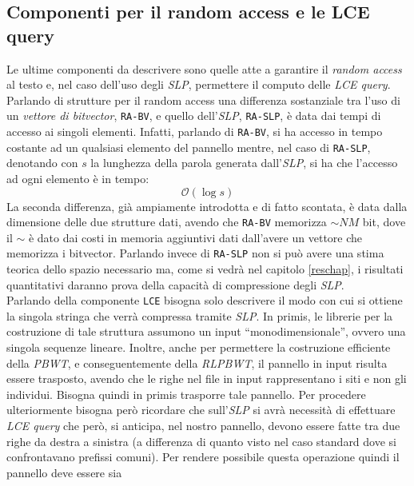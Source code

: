 \subsection{Componenti per il random access e le LCE query}
Le ultime componenti da descrivere sono quelle atte a garantire il
\textit{random access} 
al testo e, nel caso dell'uso degli \textit{SLP}, permettere il computo delle
\textit{LCE query}.\\
Parlando di strutture per il random access una differenza sostanziale tra
l'uso di un \textit{vettore di bitvector}, \texttt{RA-BV}, e quello
dell'\textit{SLP}, \texttt{RA-SLP}, è data dai tempi di accesso ai singoli
elementi. Infatti, parlando di \texttt{RA-BV}, si ha accesso in tempo costante
ad un qualsiasi elemento del pannello mentre, nel caso di \texttt{RA-SLP},
denotando con $s$ la lunghezza della parola generata dall'\textit{SLP}, si ha
che l'accesso ad ogni elemento è in tempo:
\begin{equation}
  \label{eq:timera}
  \mathcal{O}(\log s)
\end{equation}
La seconda differenza, già ampiamente introdotta e di fatto scontata, è data
dalla dimensione delle due strutture dati, avendo che \texttt{RA-BV} memorizza
$\sim NM$ bit, dove il $\sim$ è dato dai costi in memoria aggiuntivi dati
dall'avere un vettore che memorizza i bitvector. Parlando invece di
\texttt{RA-SLP} non si può avere una stima teorica dello spazio necessario ma,
come si vedrà nel capitolo \ref{reschap}, i risultati quantitativi daranno prova
della capacità di compressione degli \textit{SLP}.\\
Parlando della componente \texttt{LCE} bisogna solo descrivere il modo con cui
si ottiene la singola stringa che verrà compressa tramite \textit{SLP}.
In primis, le
librerie per la costruzione di tale struttura assumono un input
``monodimensionale'', ovvero una singola sequenze lineare. Inoltre, anche per
permettere la costruzione efficiente della \textit{PBWT}, e conseguentemente
della \textit{RLPBWT}, il pannello in input risulta essere trasposto, avendo che
le righe nel file in input rappresentano i siti e non gli individui. Bisogna
quindi in primis trasporre tale pannello. Per procedere ulteriormente bisogna
però ricordare che sull'\textit{SLP} si avrà 
necessità di effettuare \textit{LCE query} che però, si anticipa, nel nostro
pannello, devono essere fatte tra due righe da destra a sinistra (a differenza
di quanto visto nel caso standard dove si confrontavano prefissi comuni). Per
rendere possibile questa operazione quindi il pannello deve essere sia 
